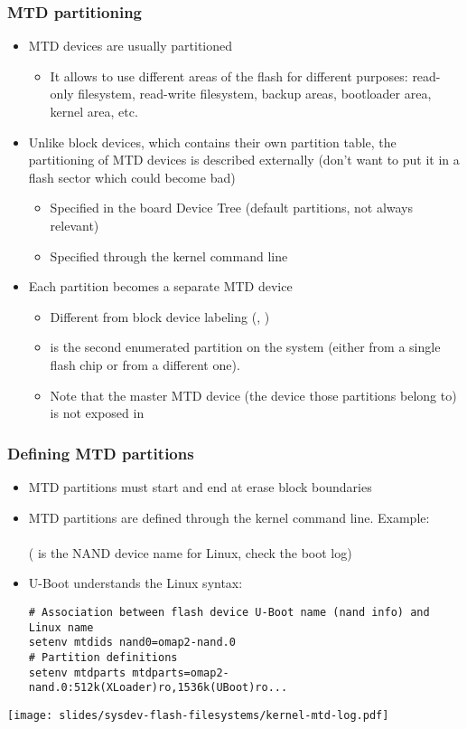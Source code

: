 \begin{frame}
  \frametitle{MTD partitioning}
  \begin{itemize}
  \item MTD devices are usually partitioned
    \begin{itemize}
    \item It allows to use different areas of the flash for different
      purposes: read-only filesystem, read-write filesystem, backup
      areas, bootloader area, kernel area, etc.
    \end{itemize}
  \item Unlike block devices, which contains their own partition
    table, the partitioning of MTD devices is described externally
    (don't want to put it in a flash sector which could become bad)
    \begin{itemize}
    \item Specified in the board Device Tree (default partitions, not always relevant)
    \item Specified through the kernel command line
    \end{itemize}
  \item Each partition becomes a separate MTD device
    \begin{itemize}
    \item Different from block device labeling (,
      )
    \item {} is the second enumerated partition on the
      system (either from a single flash chip or from a different one).
    \item Note that the master MTD device (the device those partitions
      belong to) is not exposed in 
    \end{itemize}
  \end{itemize}
\end{frame}

\begin{frame}[fragile]
  \frametitle{Defining MTD partitions}
  \scriptsize
  \begin{itemize}
  \item MTD partitions must start and end at erase block boundaries
  \item MTD partitions are defined through the kernel command line. Example:\\
        \\
	( is the NAND device name for Linux, check the boot log)
  \item U-Boot understands the Linux syntax:
  \begin{verbatim}
# Association between flash device U-Boot name (nand info) and Linux name
setenv mtdids nand0=omap2-nand.0
# Partition definitions
setenv mtdparts mtdparts=omap2-nand.0:512k(XLoader)ro,1536k(UBoot)ro...
  \end{verbatim}
  \end{itemize}
  \texttt{[image: slides/sysdev-flash-filesystems/kernel-mtd-log.pdf]}
\end{frame}


